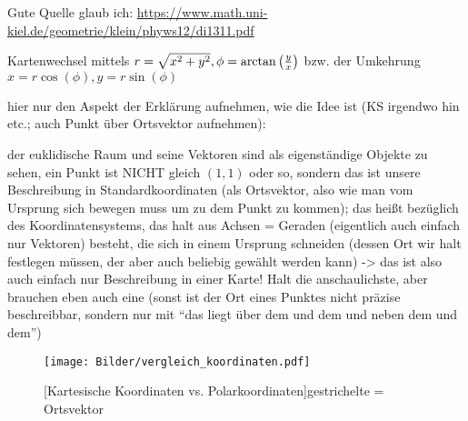 \documentclass[../H_Analysis_main.tex]{subfiles}
\begin{document}
Gute Quelle glaub ich: \url{https://www.math.uni-kiel.de/geometrie/klein/phyws12/di1311.pdf}

\begin{bsp}
Kartenwechsel mittels $r = \sqrt{x^2 + y^2}, \phi = \arctan\qty(\frac{y}{x})$ bzw. der Umkehrung $x = r \cos(\phi), y = r \sin(\phi)$


hier nur den Aspekt der Erklärung aufnehmen, wie die Idee ist (KS irgendwo hin etc.; auch Punkt über Ortsvektor aufnehmen):

der euklidische Raum und seine Vektoren sind als eigenständige Objekte zu sehen, ein Punkt ist NICHT gleich $(1, 1)$ oder so, sondern das ist unsere Beschreibung in Standardkoordinaten (als Ortsvektor, also wie man vom Ursprung sich bewegen muss um zu dem Punkt zu kommen); das heißt bezüglich des Koordinatensystems, das halt aus Achsen = Geraden (eigentlich auch einfach nur Vektoren) besteht, die sich in einem Ursprung schneiden (dessen Ort wir halt festlegen müssen, der aber auch beliebig gewählt werden kann) -> das ist also auch einfach nur Beschreibung in einer Karte! Halt die anschaulichste, aber brauchen eben auch eine (sonst ist der Ort eines Punktes nicht präzise beschreibbar, sondern nur mit \enquote{das liegt über dem und dem und neben dem und dem})
\end{bsp}

\begin{figure}[ht]
\centering

\texttt{[image: Bilder/vergleich\_koordinaten.pdf]}

[Kartesische Koordinaten vs. Polarkoordinaten]{gestrichelte = Ortsvektor}
\label{fig:koordinaten_rn}
\end{figure}
\end{document}
